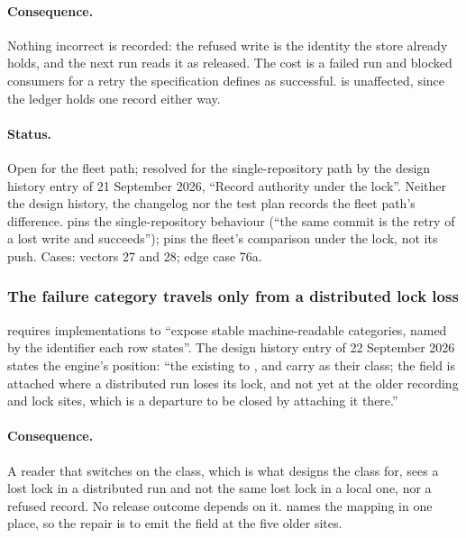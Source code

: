 \paragraph{Consequence.} Nothing incorrect is recorded: the refused write is
the identity the store already holds, and the next run reads it as released.
The cost is a failed run and blocked consumers for a retry the specification
defines as successful.  is unaffected, since the
ledger holds one record either way.

\paragraph{Status.} Open for the fleet path; resolved for the
single-repository path by the design history entry of 21 September 2026,
``Record authority under the lock''. Neither the design history, the
changelog nor the test plan records the fleet path's difference.
 pins the single-repository
behaviour (``the same commit is the retry of a lost write and succeeds'');
 pins the fleet's comparison
under the lock, not its push. Cases:  vectors 27 and 28; edge case
76a.

\subsubsection{The failure category travels only from a distributed lock loss}

\begin{obligation}
\label{ob:category}
 requires implementations to ``expose stable machine-readable
categories, named by the identifier each row states''. The design history
entry of 22 September 2026 states the engine's position: ``the existing
 to ,  and  carry
 as their class; the field is attached where
a distributed run loses its lock, and not yet at the older recording and
lock sites, which is a departure to be closed by attaching it there.''
\end{obligation}

\paragraph{Consequence.} A reader that switches on the class, which is what
 designs the class for, sees a lost lock in a distributed run and
not the same lost lock in a local one, nor a refused record. No release
outcome depends on it.  names the mapping in one
place, so the repair is to emit the field at the five older sites.

